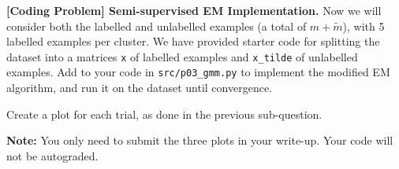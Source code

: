 \ifnum{} {
  \clearpage
} \fi
\item{}
\textbf{[Coding Problem] Semi-supervised EM Implementation.}
Now we will consider both the labelled and unlabelled examples (a total of $m + \tilde{m}$), with 5 labelled examples per cluster. We have provided starter code for splitting the dataset into a matrices \texttt{x} of labelled examples and \texttt{x\_tilde} of unlabelled examples. Add to your code in \texttt{src/p03\_gmm.py} to implement the modified EM algorithm, and run it on the dataset until convergence.

Create a plot for each trial, as done in the previous sub-question.

\textbf{Note:} You only need to submit the three plots in your write-up. Your code will not be autograded.

\ifnum{} {
  
} \fi
